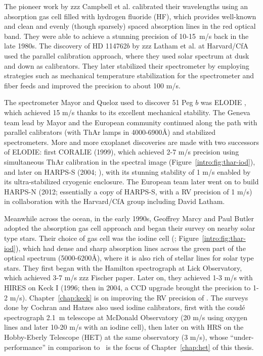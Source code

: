 The pioneer work by zzz Campbell et al. calibrated their wavelengths
using an absorption gas cell filled with hydrogen fluoride (HF), which
provides well-known and clean and evenly (though sparsely) spaced
absorption lines in the red optical band. They were able to achieve a
stunning precision of 10-15~m/s back in the late 1980s. The discovery
of HD 114762$b$ by zzz Latham et al. at Harvard/CfA used the parallel
calibration approach, where they used solar spectrum at dusk and down
as calibrators. They later stabilized their spectrometer by employing
strategies such as mechanical temperature stabilization for the
spectrometer and fiber feeds and improved the precision to about 100
m/s.

The spectrometer Mayor and Queloz used to discover 51 Peg $b$ was
ELODIE \citep{elodie}, which achieved 15 m/s thanks to its excellent
mechanical stability. The Geneva team lead by Mayor and the European
community continued along the path with parallel calibrators (with
ThAr lamps in 4000-6900\AA) and stabilized spectrometers. More and
more exoplanet discoveries are made with two successors of ELODIE:
first CORALIE (1999), which achieved 2-7 m/s precision using
simultaneous ThAr calibration in the spectral image
(Figure~\ref{intro:fig:thar-iod}), and later on HARPS-S (2004;
\citealt{harps-s}), with its stunning stability of 1 m/s enabled by
its ultra-stabilized cryogenic enclosure. The European team later went
on to build HARPS-N (2012; essentially a copy of HARPS-S, with a RV
precision of 1 m/s) in collaboration with the Harvard/CfA group
including David Latham.

Meanwhile across the ocean, in the early 1990s, Geoffrey Marcy and
Paul Butler adopted the absorption gas cell approach and began their
survey on nearby solar type stars. Their choice of gas cell was the
iodine cell (\citealt{1992PASP..104..270M};
Figure~\ref{intro:fig:thar-iod}), which had dense and sharp absorption
lines across the green part of the optical spectrum (5000-6200\AA),
where it is also rich of stellar lines for solar type stars. They
first began with the Hamilton spectrograph at Lick Observatory, which
achieved 3-7 m/s zzz Fischer paper. Later on, they achieved 1-3 m/s
with HIRES on Keck I (1996; then in 2004, a CCD upgrade brought the
precision to 1-2 m/s). Chapter~\ref{chap:keck} is on improving the RV
precision of \keck. The surveys done by Cochran and Hatzes also used
iodine calibrators, first with the coud\'e spectrograph 2.1~m
telescope at McDonald Observatory (20 m/s using oxygen lines and later
10-20 m/s with an iodine cell), then later on with HRS on the
Hobby-Eberly Telescope (HET) at the same observatory (3 m/s), whose
``under-performance'' in comparison to \keck\ is the focus of
Chapter~\ref{chap:het} of this thesis.


